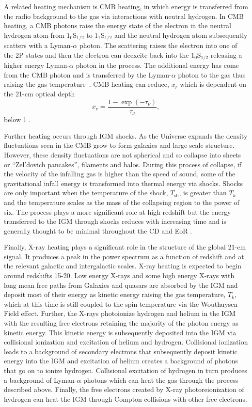 A related heating mechanism is CMB heating, in which energy is transferred from the radio background to the gas via interactions with neutral hydrogen. In CMB heating, a CMB photons raise the energy state of the electron in the neutral hydrogen atom from $1_0$S$_{1/2}$ to $1_1$S$_{1/2}$ and the neutral hydrogen atom subsequently scatters with a Lyman-$\alpha$ photon. The scattering raises the electron into one of the 2P states and then the electron can deexcite back into the $1_0$S$_{1/2}$ releasing a higher energy Lyman-$\alpha$ photon in the process. The additional energy has come from the CMB photon and is transferred by the Lyman-$\alpha$ photon to the gas thus raising the gas temperature~\cite{Venumadhav2018}. CMB heating can reduce, $x_r$ which is dependent on the 21-cm optical depth
\begin{equation}
    x_r = \frac{1 - \exp(-\tau_\nu)}{\tau_\nu},
\end{equation}
below 1 \cite{Reis_sta_2021}.

Further heating occurs through IGM shocks. As the Universe expands the density fluctuations seen in the CMB grow to form galaxies and large scale structure. However, these density fluctuations are not spherical and so collapse into sheets or ``Zel'dovich pancakes'', filaments and halos. During this process of collapse, if the velocity of the infalling gas is higher than the speed of sound, some of the gravitational infall energy is transformed into thermal energy via shocks. Shocks are only important when the temperature of the shock, $T_\mathrm{sh}$, is greater than $T_k$ and the temperature scales as the mass of the collapsing region to the power of six. The process plays a more significant role at high redshift but the energy transferred to the IGM through shocks reduces with increasing time and is generally thought to be minimal throughout the CD and EoR \cite{Furlanetto_review_2006, Mesinger2019}.

Finally, X-ray heating plays a significant role in the structure of the global 21-cm signal. It produces a peak in the power spectrum as a function of redshift and at the relevant galactic and intergalactic scales. X-ray heating is expected to begin around redshifts 15-20. Low energy X-rays and some high energy X-rays with long mean free paths from Galaxies and quasars are absorbed by the IGM and deposit most of their energy as kinetic energy raising the gas temperature, $T_k$, which at this time is still coupled to the spin temperature via the Wouthuysen-Field effect. Further, the X-rays photoionize hydrogen and helium in the IGM with the resulting free electrons retaining the majority of the photon energy as kinetic energy. This kinetic energy is subsequently deposited into the IGM via collisional ionization and excitation of helium and hydrogen. Collisional ionization leads to a background of secondary electrons that subsequently deposit kinetic energy into the IGM and excitation of helium creates a background of photons that go on to ionize hydrogen. Collisional excitation of hydrogen in turn produces a background of Lyman-$\alpha$ photons which can heat the gas through the process described above. Finally, the free electrons created by X-ray photoreionization of hydrogen can heat the IGM through Compton collisions with other free electrons.

